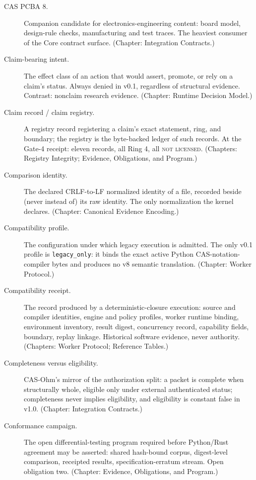 \begin{description}
\item[CAS PCBA 8.] Companion candidate for electronics-engineering content: board model, design-rule checks, manufacturing and test traces. The heaviest consumer of the Core contract surface. (Chapter: Integration Contracts.)

\item[Claim-bearing intent.] The effect class of an action that would assert, promote, or rely on a claim's status. Always denied in v0.1, regardless of structural evidence. Contrast: nonclaim research evidence. (Chapter: Runtime Decision Model.)

\item[Claim record / claim registry.] A registry record registering a claim's exact statement, ring, and boundary; the registry is the byte-backed ledger of such records. At the Gate-4 receipt: eleven records, all Ring 4, all \textsc{not licensed}. (Chapters: Registry Integrity; Evidence, Obligations, and Program.)

\item[Comparison identity.] The declared CRLF-to-LF normalized identity of a file, recorded beside (never instead of) its raw identity. The only normalization the kernel declares. (Chapter: Canonical Evidence Encoding.)

\item[Compatibility profile.] The configuration under which legacy execution is admitted. The only v0.1 profile is \texttt{legacy\_only}: it binds the exact active Python CAS-notation-compiler bytes and produces no v8 semantic translation. (Chapter: Worker Protocol.)

\item[Compatibility receipt.] The record produced by a deterministic-closure execution: source and compiler identities, engine and policy profiles, worker runtime binding, environment inventory, result digest, concurrency record, capability fields, boundary, replay linkage. Historical software evidence, never authority. (Chapters: Worker Protocol; Reference Tables.)

\item[Completeness versus eligibility.] CAS-Ohm's mirror of the authorization split: a packet is complete when structurally whole, eligible only under external authenticated status; completeness never implies eligibility, and eligibility is constant false in v1.0. (Chapter: Integration Contracts.)

\item[Conformance campaign.] The open differential-testing program required before Python/Rust agreement may be asserted: shared hash-bound corpus, digest-level comparison, receipted results, specification-erratum stream. Open obligation two. (Chapter: Evidence, Obligations, and Program.)


\end{description}
